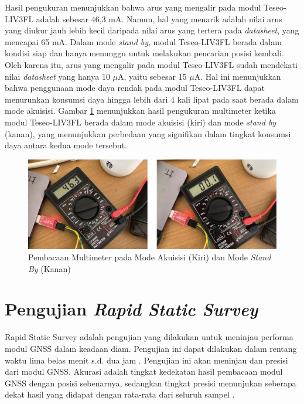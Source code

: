 Hasil pengukuran menunjukkan bahwa arus yang mengalir pada modul Teseo-LIV3FL adalah sebesar 46,3 mA. Namun, hal yang menarik adalah nilai arus yang diukur jauh lebih kecil daripada nilai arus yang tertera pada \textit{datasheet}, yang mencapai 65 mA. Dalam mode \textit{stand by}, modul Teseo-LIV3FL berada dalam kondisi siap dan hanya menunggu untuk melakukan pencarian posisi kembali. Oleh karena itu, arus yang mengalir pada modul Teseo-LIV3FL sudah mendekati nilai \textit{datasheet} yang hanya 10 $\mu$A, yaitu sebesar 15 $\mu$A. Hal ini menunjukkan bahwa penggunaan mode daya rendah pada modul Teseo-LIV3FL dapat menurunkan konsumsi daya hingga lebih dari 4 kali lipat pada saat berada dalam mode akuisisi. Gambar \ref{Fig: low-power-result} menunjukkan hasil pengukuran multimeter ketika modul Teseo-LIV3FL berada dalam mode akuisisi (kiri) dan mode \textit{stand by} (kanan), yang menunjukkan perbedaan yang signifikan dalam tingkat konsumsi daya antara kedua mode tersebut.

\begin{figure}[H]
	\centering
	\captionsetup{justification=centering}
	\includegraphics[width=14cm]{contents/chapter-4/low-power-result.jpg}
	\caption{Pembacaan Multimeter pada Mode Akuisisi (Kiri) dan Mode \textit{Stand By} (Kanan)}
	\label{Fig: low-power-result}
\end{figure}

\section{Pengujian \textit{Rapid Static Survey}}
Rapid Static Survey adalah pengujian yang dilakukan untuk meninjau performa modul GNSS dalam keadaan diam. Pengujian ini dapat dilakukan dalam rentang waktu lima belas menit s.d. dua jam \cite{lauer2019static}. Pengujian ini akan meninjau  dan presisi dari modul GNSS. Akurasi adalah tingkat kedekatan hasil pembacaan modul GNSS dengan posisi sebenarnya, sedangkan tingkat presisi menunjukan seberapa dekat hasil yang didapat dengan rata-rata dari seluruh sampel \cite{gnssca_apn029}.

